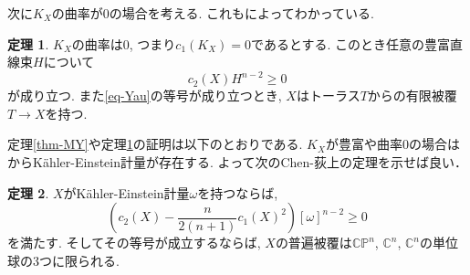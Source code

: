 \documentclass[dvipdfmx]{msjproc}
\theoremstyle{definition}
\newtheorem{thm}{定理}[section]
\newcommand{\C}{\mathbb{C}}
\begin{document}
次に$K_X $の曲率が0の場合を考える. これも\cite{Yau77}によってわかっている. 
\begin{thm}\cite{Yau77}
\label{thm-Yau}
$K_X $の曲率は0, つまり$c_1(K_X)=0$であるとする. 
このとき任意の豊富直線束$H$について
\begin{equation}
\label{eq-Yau}
c_2(X) H^{n-2}\ge 0
\end{equation}
が成り立つ. また\eqref{eq-Yau}の等号が成り立つとき, $X$はトーラス$T$からの有限被覆$T \to X$を持つ.
\end{thm}

定理\ref{thm-MY}や定理\ref{thm-Yau}の証明は以下のとおりである.
 $K_X$が豊富や曲率0の場合は\cite{Yau77}からK\"ahler-Einstein計量が存在する.
 よって次のChen-荻上の定理\cite{CO75}を示せば良い．
 \begin{thm}\cite{CO75}
 \label{thm-CO75}
$X$がK\"ahler-Einstein計量$\omega$を持つならば, 
 \begin{equation}
\label{eq-CO75}
\left(c_2(X) - \frac{n}{2(n+1)}c_1(X)^{2} \right) [\omega]^{n-2}\ge 0
\end{equation}
を満たす. そしてその等号が成立するならば, $X$の普遍被覆は$\C\mathbb{P}^n$, $\C^n$, $\C^n$の単位球の3つに限られる. 
 \end{thm}
\end{document}
